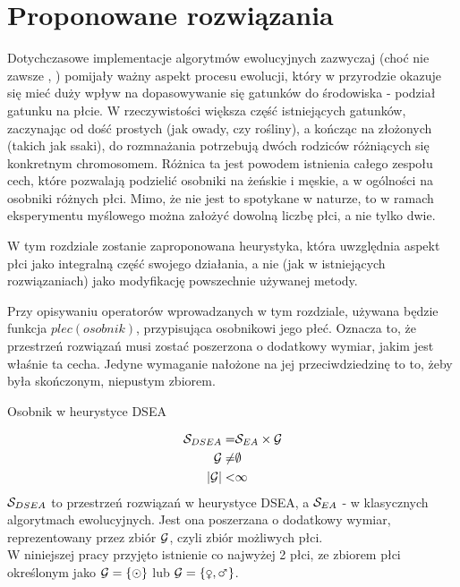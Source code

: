 \documentclass[./FM_mgr.tex]{subfiles}
\begin{document}
\chapter{Proponowane rozwiązania} \label{chapter:proposed}

Dotychczasowe implementacje algorytmów ewolucyjnych zazwyczaj (choć nie zawsze \cite{GGA}, \cite{SexualGA}) pomijały ważny aspekt procesu ewolucji, który w przyrodzie okazuje się mieć duży wpływ na dopasowywanie się gatunków do środowiska - podział gatunku na płcie. 
W rzeczywistości większa część istniejących gatunków, zaczynając od dość prostych (jak owady, czy rośliny), a kończąc na złożonych (takich jak ssaki), do rozmnażania potrzebują dwóch rodziców różniących się konkretnym chromosomem. 
Różnica ta jest powodem istnienia całego zespołu cech, które pozwalają podzielić osobniki na żeńskie i męskie, a w ogólności na osobniki różnych płci. 
Mimo, że nie jest to spotykane w naturze, to w ramach eksperymentu myślowego można założyć dowolną liczbę płci, a nie tylko dwie.

W tym rozdziale zostanie zaproponowana heurystyka, która uwzględnia aspekt płci jako integralną część swojego działania, a nie (jak w istniejących rozwiązaniach) jako modyfikację powszechnie używanej metody.

Przy opisywaniu operatorów wprowadzanych w tym rozdziale, używana będzie funkcja $plec(osobnik)$, przypisująca osobnikowi jego płeć.
Oznacza to, że przestrzeń rozwiązań musi zostać poszerzona o dodatkowy wymiar, jakim jest właśnie ta cecha.
Jedyne wymaganie nałożone na jej przeciwdziedzinę to to, żeby była skończonym, niepustym zbiorem.

\begin{signature}
	\caption{Osobnik w heurystyce DSEA \label{signature:specimen_dsea}}
	\begin{align}
		\mathcal{S}_{DSEA} = &\mathcal{S}_{EA} \times \mathcal{G} \\
		\mathcal{G} \neq & \emptyset \\
		|\mathcal{G}| < &\infty
	\end{align}	
	$\mathcal{S}_{DSEA}$ to przestrzeń rozwiązań w heurystyce DSEA, a $\mathcal{S}_{EA}$ - w klasycznych algorytmach ewolucyjnych.
	Jest ona poszerzana o dodatkowy wymiar, reprezentowany przez zbiór $\mathcal{G}$, czyli zbiór możliwych płci.\\
	W niniejszej pracy przyjęto istnienie co najwyżej 2 płci, ze zbiorem płci określonym jako $\mathcal{G} = \{ \odot \}$ lub $\important{G} = \{ \female, \male \}$.
\end{signature}
\end{document}
